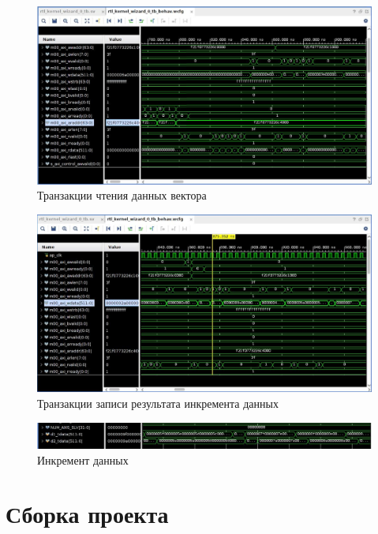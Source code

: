 \begin{figure}[H]
	\begin{center}
		\includegraphics[scale=0.5]{assets/read.png}
	\end{center}
	\caption{Транзакции чтения данных вектора}
\end{figure}

\begin{figure}[H]
	\begin{center}
		\includegraphics[scale=0.5]{assets/write.png}
	\end{center}
	\caption{Транзакции записи результата инкремента данных}
\end{figure}

\begin{figure}[H]
	\begin{center}
		\includegraphics[scale=0.5]{assets/inc.png}
	\end{center}
	\caption{Инкремент данных}
\end{figure}

\chapter{Сборка проекта}


